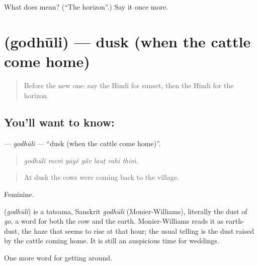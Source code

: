 \begin{tcolorbox}[breakable,colback=teal!4,colframe=teal!35!black,title={Before you move on}]
What does  mean? (\textquotedblleft{}The horizon\textquotedblright{}.) Say it once more.
\end{tcolorbox}
\section[\texorpdfstring{\hi{गोधूलि} (godhūli)}{गोधूलि (godhūli)}]{ (godhūli) — dusk (when the cattle come home)}

\label{lesson:HI-C441-godhuli}



\begin{quote}
Before the new one: say the Hindi for sunset, then the Hindi for the horizon.
\end{quote}

\subsection*{You'll want to know: }
\textbf{} — \emph{godhūli} — \textquotedblleft{}dusk (when the cattle come home)\textquotedblright{}.

\begin{quote}
      
\end{quote}

\begin{quote}
\emph{godhūli meṁ gāyẽ gā̃v lauṭ rahī thīṁ.}
\end{quote}

\begin{quote}
At dusk the cows were coming back to the village.
\end{quote}

Feminine.

\begin{cousinweb}
\textbf{} (\emph{godhūli}) is a tatsama, Sanskrit \emph{godhūli} (Monier-Williams), literally the dust of \emph{go}, a word for both the cow and the earth. Monier-Williams reads it as earth-dust, the haze that seems to rise at that hour; the usual telling is the dust raised by the cattle coming home. It is still an auspicious time for weddings.
\end{cousinweb}

\begin{grammarlens}[title={What you've built}]
One more word for getting around.
\end{grammarlens}

